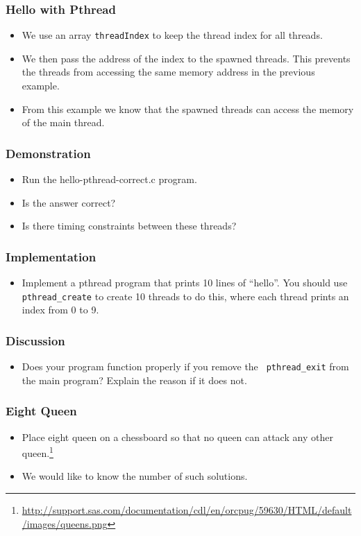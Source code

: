 \documentclass{beamer}
\begin{document}
\begin{frame}
\frametitle{Hello with Pthread}
\end{frame}

\begin{frame}
\begin{itemize}
\frametitle{Main Thread Variables}
\item We use an array {\tt threadIndex} to keep the thread index for
  all threads.
\item We then pass the address of the index to the spawned threads.
  This prevents the threads from accessing the same memory address in
  the previous example.
\item From this example we know that the spawned threads can access
  the memory of the main thread.
\end{itemize}
\end{frame}

\begin{frame}
\frametitle{Demonstration}
\begin{itemize}
\item Run the hello-pthread-correct.c program.
\item Is the answer correct?
\item Is there timing constraints between these threads?
\end{itemize}
\end{frame}

\begin{frame}
\frametitle{Implementation}
\begin{itemize}
\item Implement a pthread program that prints 10 lines of ``hello''.
  You should use {\tt pthread\_create} to create 10 threads to do
  this, where each thread prints an index from 0 to 9.
\end{itemize}
\end{frame}

\begin{frame}
\frametitle{Discussion}
\begin{itemize}
\item Does your program function properly if you remove the {\tt
  pthread\_exit} from the main program?  Explain the reason if it does
  not.
\end{itemize}
\end{frame}

\begin{frame}
\frametitle{Eight Queen} 
\begin{itemize}
\item Place eight queen on a chessboard so that no queen can attack
  any other
  queen.\footnote{\url{http://support.sas.com/documentation/cdl/en/orcpug/59630/HTML/default/images/queens.png}}
\item We would like to know the number of such solutions.
\end{itemize}
\centerline{}
\end{frame}
\end{document}

